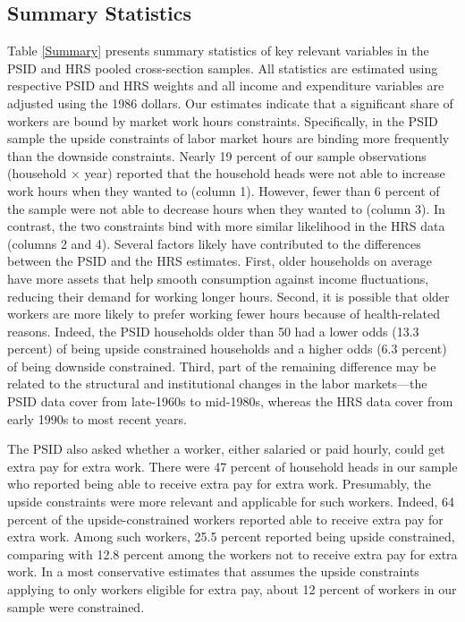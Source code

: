 \subsection{Summary Statistics}

Table \ref{Summary} presents summary statistics of key relevant variables in the PSID and HRS pooled cross-section samples. All statistics are estimated using respective PSID and HRS weights and all income and expenditure variables are adjusted using the 1986 dollars. Our estimates indicate that a significant share of workers are bound by market work hours constraints. Specifically, in the PSID sample the upside constraints of labor market hours are binding more frequently than the downside constraints. Nearly 19 percent of our sample observations (household $\times$ year) reported that the household heads were not able to increase work hours when they wanted to (column 1). However, fewer than 6 percent of the sample were not able to decrease hours when they wanted to (column 3). In contrast, the two constraints bind with more similar likelihood in the HRS data (columns 2 and 4). Several factors likely have contributed to the differences between the PSID and the HRS estimates. First, older households on average have more assets that help smooth consumption against income fluctuations, reducing their demand for working longer hours. Second, it is possible that older workers are more likely to prefer working fewer hours because of health-related reasons. Indeed, the PSID households older than 50 had a lower odds (13.3 percent) of being upside constrained households and a higher odds (6.3 percent) of being downside constrained.  Third, part of the remaining difference may be related to the structural and institutional changes in the labor markets---the PSID data cover from late-1960s to mid-1980s, whereas the HRS data cover from early 1990s to most recent years.

The PSID also asked whether a worker, either salaried or paid hourly, could get extra pay for extra work.  There were 47 percent of household heads in our sample who reported being able to receive extra pay for extra work.  Presumably, the upside constraints were more relevant and applicable for such workers. Indeed, 64 percent of the upside-constrained workers reported able to receive extra pay for extra work. Among such workers, 25.5 percent reported being upside constrained, comparing with 12.8 percent among the workers not to receive extra pay for extra work.  In a most conservative estimates that assumes the upside constraints applying to only workers eligible for extra pay, about 12 percent of workers in our sample were constrained.

